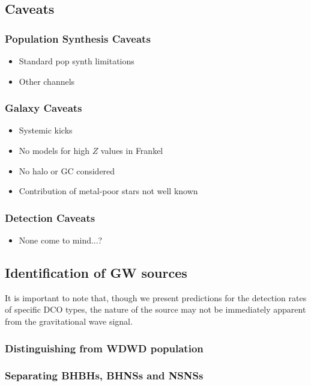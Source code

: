 \subsection{Caveats}

\subsubsection{Population Synthesis Caveats}
\begin{itemize}
    \item Standard pop synth limitations
    \item Other channels
\end{itemize}

\subsubsection{Galaxy Caveats}
\begin{itemize}
    \item Systemic kicks
    \item No models for high $Z$ values in Frankel
    \item No halo or GC considered %
    \item Contribution of metal-poor stars not well known
\end{itemize}

\subsubsection{Detection Caveats}
\begin{itemize}
    \item None come to mind...?
\end{itemize}

\subsection{Identification of GW sources}
It is important to note that, though we present predictions for the detection rates of specific DCO types, the nature of the source may not be immediately apparent from the gravitational wave signal.

\subsubsection{Distinguishing from WDWD population}
\subsubsection{Separating BHBHs, BHNSs and NSNSs}